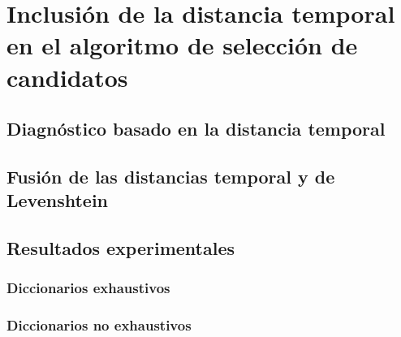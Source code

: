 \chapter{Inclusión de la distancia temporal en el algoritmo de selección de
candidatos}
\label{ch:Cycle}


\lettrine[lraise=-0.1, lines=2, loversize=0.2]{}{}


\section{Diagnóstico basado en la distancia temporal}
\label{sec:CycleCands}


\section{Fusión de las distancias temporal y de Levenshtein}
\label{sec:FusionLevenCycle}


\section{Resultados experimentales}
\label{sec:CycleResults}


\subsection{Diccionarios exhaustivos}
\label{subsec:CycDicExhaust}


\subsection{Diccionarios no exhaustivos}
\label{subsec:CycDicNoExhaust}


\endinput
